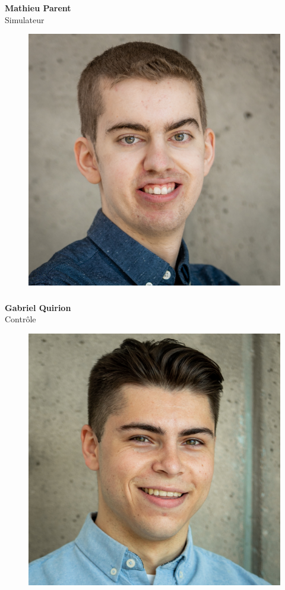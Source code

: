 \documentclass[a0paper,portrait]{baposter}
\begin{document}
\begin{poster}
{\subsubsection*{}
\vspace{2mm}
\textbf{Mathieu Parent}\\
Simulateur

\begin{figure}
\includegraphics[width=.9\linewidth]{img/membres/Gabriel-Quirion-3.jpg} 
\end{figure}
\subsubsection*{}
\vspace{2mm}
\textbf{Gabriel Quirion}\\
Contrôle

\begin{figure}
\includegraphics[width=.9\linewidth]{img/membres/William-Rousseau-2.jpg} 
\end{figure}
}
\end{poster}
\end{document}
